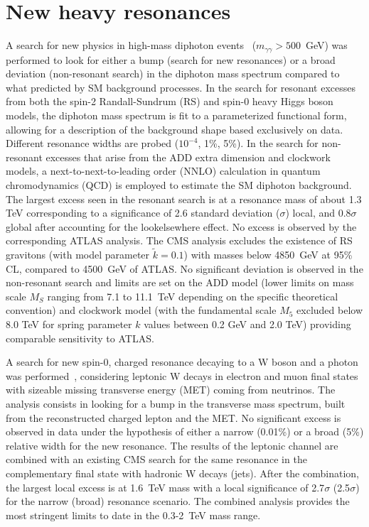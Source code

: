 \documentclass{moriond}
\begin{document}
\section{New heavy resonances}

A search for new physics in high-mass diphoton events~\cite{CMS-PAS-EXO-22-024}
($m_{\gamma\gamma}>500$~GeV) was performed to look for either
a bump (search for new resonances) or a broad deviation (non-resonant search) in the
diphoton mass spectrum compared to what predicted by SM background processes.
In the search for resonant excesses from both the spin-2
Randall-Sundrum (RS) and spin-0 heavy Higgs boson models, the diphoton mass spectrum is fit to a
parameterized functional form, allowing for a description of the background shape
based exclusively on data. Different resonance widths are probed
($10^{-4}$, 1\%, 5\%).
In the search for non-resonant excesses that arise from the ADD extra dimension and clockwork models, a
next-to-next-to-leading order (NNLO)
calculation in quantum chromodynamics (QCD) is employed to estimate
the SM diphoton background. The largest excess seen in the
resonant search is at a resonance mass of about 1.3 TeV corresponding to a
significance of 2.6 standard deviation ($\sigma$) local, and
0.8$\sigma$ global after accounting for the lookelsewhere effect. No
excess is observed by the corresponding ATLAS analysis. The CMS
analysis excludes the existence of RS gravitons (with model parameter
$\tilde{k}=0.1$) with masses below 4850~GeV at 95\% CL, compared to 4500~GeV of
ATLAS. No significant deviation is observed in the non-resonant search
and limits are set on the ADD model (lower limits on mass scale $M_S$
ranging from 7.1 to 11.1~TeV depending on the specific theoretical convention) and
clockwork model (with the fundamental scale $M_5$ excluded below
8.0 TeV for spring parameter $k$ values between 0.2 GeV and 2.0 TeV) providing comparable
sensitivity to ATLAS.

A search for new spin-0, charged resonance decaying to a W boson and a photon
was performed~\cite{CMS-PAS-EXO-21-017}, considering leptonic W decays in electron and muon
final states with sizeable missing transverse energy (MET) coming from
neutrinos. The analysis consists in looking for a bump in the
transverse mass spectrum, built from the reconstructed charged lepton
and the MET. No significant excess is observed in data under the
hypothesis of either a narrow (0.01\%) or a broad (5\%) relative width
for the new resonance. The results of the leptonic channel are combined with an existing CMS search for
the same resonance in the complementary final state with hadronic W
decays (jets). After the combination, the largest local excess is at
1.6~TeV mass with a local significance of 2.7$\sigma$ (2.5$\sigma$) for the
narrow (broad) resonance scenario. The combined analysis provides the most
stringent limits to date in the 0.3-2~TeV mass range.
\end{document}
